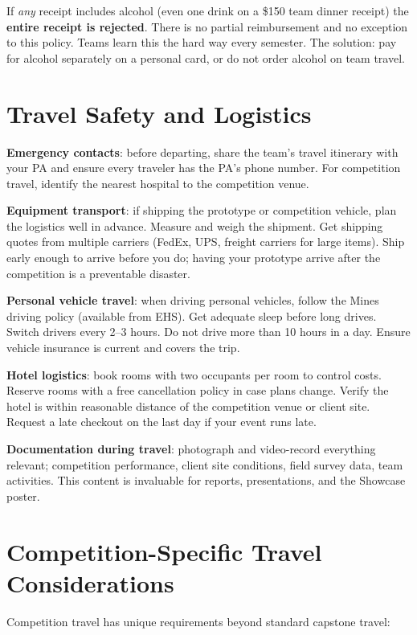 \begin{warningbox}
If \emph{any} receipt includes alcohol (even one drink on a \$150 team dinner receipt) the \textbf{entire receipt is rejected}. There is no partial reimbursement and no exception to this policy. Teams learn this the hard way every semester. The solution: pay for alcohol separately on a personal card, or do not order alcohol on team travel.
\end{warningbox}



\section{Travel Safety and Logistics}
\textbf{Emergency contacts}: before departing, share the team's travel itinerary with your PA and ensure every traveler has the PA's phone number. For competition travel, identify the nearest hospital to the competition venue.

\textbf{Equipment transport}: if shipping the prototype or competition vehicle, plan the logistics well in advance. Measure and weigh the shipment. Get shipping quotes from multiple carriers (FedEx, UPS, freight carriers for large items). Ship early enough to arrive before you do; having your prototype arrive after the competition is a preventable disaster.

\textbf{Personal vehicle travel}: when driving personal vehicles, follow the Mines driving policy (available from EHS). Get adequate sleep before long drives. Switch drivers every 2--3 hours. Do not drive more than 10 hours in a day. Ensure vehicle insurance is current and covers the trip.

\textbf{Hotel logistics}: book rooms with two occupants per room to control costs. Reserve rooms with a free cancellation policy in case plans change. Verify the hotel is within reasonable distance of the competition venue or client site. Request a late checkout on the last day if your event runs late.

\textbf{Documentation during travel}: photograph and video-record everything relevant; competition performance, client site conditions, field survey data, team activities. This content is invaluable for reports, presentations, and the Showcase poster.

\section{Competition-Specific Travel Considerations}
Competition travel has unique requirements beyond standard capstone travel:


